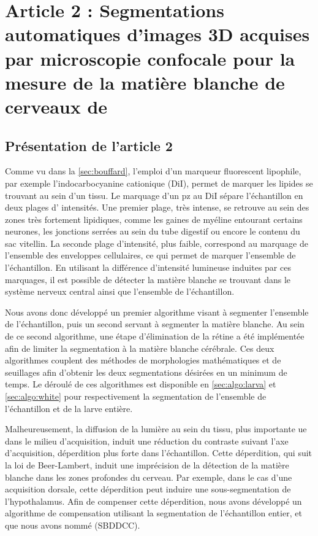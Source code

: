 \documentclass[\main/main.tex]{subfiles}
\begin{document}
\chapter{\label{sec:lempereur_info}
Article 2 : Segmentations automatiques d'images 3D acquises par microscopie confocale pour la mesure de la matière blanche de cerveaux de \pz{}
}

\section{Présentation de l'article 2}
%
Comme vu dans la \autoref{sec:bouffard}, l'emploi d'un marqueur fluorescent lipophile, par exemple l'indocarbocyanine cationique (DiI), permet de marquer les lipides se trouvant au sein d'un tissu.
%
Le marquage d'un pz{} au DiI sépare l'échantillon en deux plages d' intensités.
%
Une premier plage, très intense,
se retrouve au sein des zones très fortement lipidiques,
comme les gaines de myéline entourant certains neurones,
les jonctions serrées au sein du tube digestif ou encore le contenu du sac vitellin.
%
La seconde plage d'intensité, plus faible, correspond au marquage de l'ensemble des
enveloppes cellulaires, ce qui permet de marquer l'ensemble de l'échantillon.
%
En utilisant la différence d'intensité lumineuse induites par ces marquages,
il est possible de détecter la matière blanche se trouvant
dans le système nerveux central ainsi que l'ensemble de l'échantillon.

%
Nous avons donc développé un premier algorithme visant à segmenter l'ensemble de l'échantillon,
puis un second servant à segmenter la matière blanche.
%
Au sein de ce second algorithme, une étape d'élimination de la rétine a été implémentée
afin de limiter la segmentation à la matière blanche cérébrale.
%
Ces deux algorithmes couplent des méthodes de morphologies mathématiques et de seuillages
afin d'obtenir les deux segmentations désirées en un minimum de temps.
%
Le déroulé de ces algorithmes est disponible en \autoref{sec:algo:larva} et \autoref{sec:algo:white}
pour respectivement la segmentation de l'ensemble de l'échantillon et de la larve entière.

%
Malheureusement, la diffusion de la lumière au sein du tissu, plus importante ue dans le milieu d'acquisition, induit une réduction du contraste suivant l'axe d'acquisition, déperdition plus forte dans l'échantillon.
%
Cette déperdition, qui suit la loi de Beer-Lambert, induit une imprécision de la détection de la matière blanche dans les zones profondes du cerveau.
%
Par exemple, dans le cas d'une acquisition dorsale,
cette déperdition peut induire une sous-segmentation de l'hypothalamus.
%
Afin de compenser cette déperdition, nous avons développé un algorithme de compensation
utilisant la segmentation de l'échantillon entier, et que nous avons nommé \sbddcc{} (SBDDCC).
\end{document}
